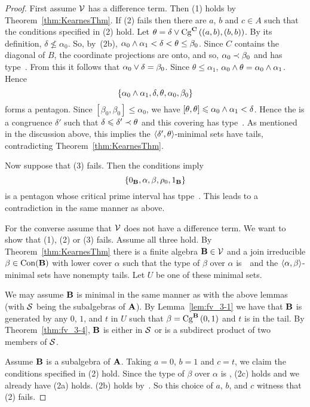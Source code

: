 \begin{proof}
First assume $\sV$ has a difference term.
Then (1) holds by Theorem~\ref{thm:KearnesThm}.
If (2) fails then there are $a$, $b$ and $c\in A$ such
that the conditions specified in (2) hold. 
Let $\theta = \delta \join \Cga {(a,b)}{(b,b)} C$. 
By its definition, $\delta \nleq \alpha_0$.
So, by~(2b), $\alpha_0\meet\alpha_1 < \delta < \theta \le \beta_0$.
Since $C$ contains the diagonal of $B$, the coordinate
projections are onto, and so, $\alpha_0 \cov \beta_0$ and has type~\atyp. 
From this it follows that $\alpha_0 \join \delta = \beta_0$.
Since $\theta \le \alpha_1$, $\alpha_0 \meet \theta = \alpha_0\meet\alpha_1$.
Hence
\[
\{\alpha_0\meet\alpha_1, \delta, \theta, \alpha_0, \beta_0 \}
\]
forms a pentagon.
Since $[\beta_0,\beta_0] \leq \alpha_0$, we have
$[\theta,\theta] \leq \alpha_0\meet\alpha_1 < \delta$.
Hence the is a congruence $\delta'$ such that 
$\delta\leq \delta' \cov \theta$ and this covering has
type~\atyp.
As mentioned in the discussion above, this implies the
$\la \delta',\theta\ra$-minimal sets have tails, contradicting
Theorem~\ref{thm:KearnesThm}.

Now suppose that (3) fails. Then the conditions imply
\[
\{0_{\alg B}, \alpha, \beta, \rho_0, 1_{\alg B} \}
\]
is a pentagon whose critical prime interval has tppe~\atyp. This 
leads to a contradiction in the same manner as above.

For the converse assume that $\sV$ does not have a difference 
term. 
We want to show that (1), (2) or (3) fails. Assume all three hold.
By Theorem~\ref{thm:KearnesThm} there is a finite 
algebra $\alg B \in \sV$ and a join irreducible 
$\beta \in \op{Con}(\alg B)$ with lower cover 
$\alpha$ such that the type of $\beta$ over $\alpha$ is~\atyp\
and the $\la\alpha,\beta\ra$-minimal sets have
nonempty tails. Let $U$ be one of these minimal sets.


We may assume $\alg B$ is minimal in the same manner as with the
above lemmas (with $\sS$ being the subalgebras of $\alg A$).
By Lemma~\ref{lem:fv_3-1} 
we have that $\alg B$ is generated by any $0$, $1$, and $t$ in
$U$ such
that $\beta = \Cga 01{B}$ and $t$ is in the tail. By 
Theorem~\ref{thm:fv_3-4}, $\alg B$ is either 
in $\sS$ or is a subdirect product of two members of $\sS$.

Assume $\alg B$ is a subalgebra of $\alg A$. Taking 
$a=0$, $b=1$ and $c=t$, we claim the conditions specified
in (2) hold. 
Since the type of $\beta$ over $\alpha$ is \atyp,
(2c) holds and we already have (2a) holds. 
(2b) holds by~\cite[Theorem~2.4]{KearnesKiss1999}.
So this choice of $a$, $b$, and $c$ witness that (2) fails.





\end{proof}
